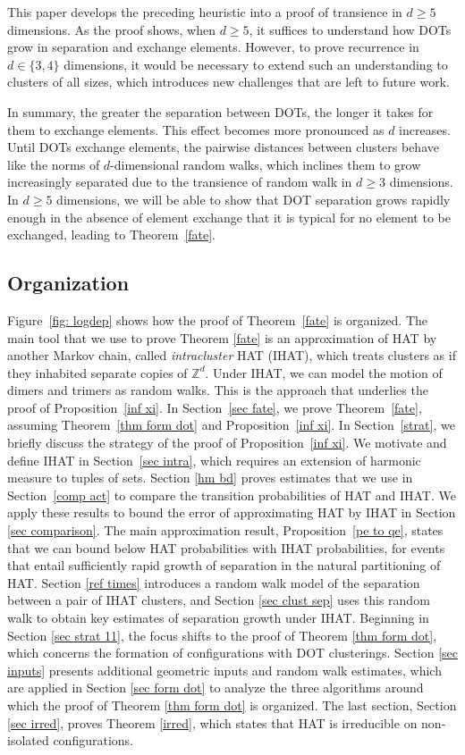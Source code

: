\documentclass[11pt,reqno]{amsart}
\theoremstyle{definition}
\numberwithin{equation}{section}
\newcommand{\Z}{\mathbb{Z}}
\newcommand{\1}{\mathbf{1}}
\begin{document}
This paper develops the preceding heuristic into a proof of transience in $d \geq 5$ dimensions. As the proof shows, when $d \geq 5$, it suffices to understand how DOTs grow in separation and exchange elements. However, to prove recurrence in $d \in \{3,4\}$ dimensions, it would be necessary to extend such an understanding to clusters of all sizes, which introduces new challenges that are left to future work.

In summary, the greater the separation between DOTs, the longer it takes for them to exchange elements. This effect becomes more pronounced as $d$ increases. Until DOTs exchange elements, the pairwise distances between clusters behave like the norms of $d$-dimensional random walks, which inclines them to grow increasingly separated due to the transience of random walk in $d \geq 3$ dimensions. In $d \geq 5$ dimensions, we will be able to show that DOT separation grows rapidly enough in the absence of element exchange that it is typical for no element to be exchanged, leading to Theorem~\ref{fate}.

\subsection*{Organization} Figure~\ref{fig: logdep} shows how the proof of Theorem~\ref{fate} is organized. The main tool that we use to prove Theorem \ref{fate} is an approximation of HAT by another Markov chain, called {\em intracluster} HAT (IHAT), which treats clusters as if they inhabited separate copies of $\Z^d$. Under IHAT, we can model the motion of dimers and trimers as random walks. This is the approach that underlies the proof of Proposition~\ref{inf xi}. In Section~\ref{sec fate}, we prove Theorem~\ref{fate}, assuming Theorem~\ref{thm form dot} and Proposition~\ref{inf xi}. In Section~\ref{strat}, we briefly discuss the strategy of the proof of Proposition~\ref{inf xi}. We motivate and define IHAT in Section~\ref{sec intra}, which requires an extension of harmonic measure to tuples of sets. Section \ref{hm bd} proves estimates that we use in Section~\ref{comp act} to compare the transition probabilities of HAT and IHAT. We apply these results to bound the error of approximating HAT by IHAT in Section \ref{sec comparison}. The main approximation result, Proposition~\ref{pe to qe}, states that we can bound below HAT probabilities with IHAT probabilities, for events that entail sufficiently rapid growth of separation in the natural partitioning of HAT. Section \ref{ref times} introduces a random walk model of the separation between a pair of IHAT clusters, and Section \ref{sec clust sep} uses this random walk to obtain key estimates of separation growth under IHAT. Beginning in Section \ref{sec strat 11}, the focus shifts to the proof of Theorem \ref{thm form dot}, which concerns the formation of configurations with DOT clusterings. Section \ref{sec inputs} presents additional geometric inputs and random walk estimates, which are applied in Section \ref{sec form dot} to analyze the three algorithms around which the proof of Theorem \ref{thm form dot} is organized. The last section, Section \ref{sec irred}, proves Theorem \ref{irred}, which states that HAT is irreducible on non-isolated configurations.
\end{document}
